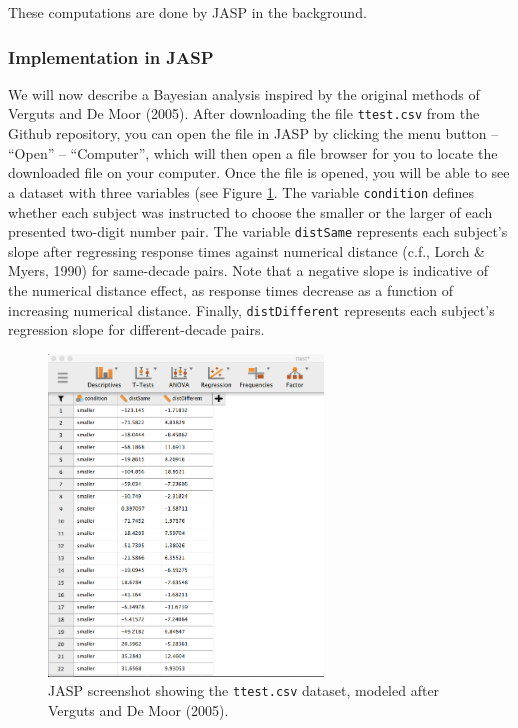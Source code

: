 \documentclass[english,,doc,floatsintext]{apa6}
\begin{document}
These computations are done by JASP in the background.

\hypertarget{implementation-in-jasp}{%
\subsubsection{Implementation in JASP}\label{implementation-in-jasp}}

We will now describe a Bayesian analysis inspired by the original methods of Verguts and De Moor (2005). After downloading the file \texttt{ttest.csv} from the Github repository, you can open the file in JASP by clicking the menu button -- \enquote{Open} -- \enquote{Computer}, which will then open a file browser for you to locate the downloaded file on your computer. Once the file is opened, you will be able to see a dataset with three variables (see Figure \ref{fig:ttestData}. The variable \texttt{condition} defines whether each subject was instructed to choose the smaller or the larger of each presented two-digit number pair. The variable \texttt{distSame} represents each subject's slope after regressing response times against numerical distance (c.f., Lorch \& Myers, 1990) for same-decade pairs. Note that a negative slope is indicative of the numerical distance effect, as response times decrease as a function of increasing numerical distance. Finally, \texttt{distDifferent} represents each subject's regression slope for different-decade pairs.

\begin{figure}
\centering
\includegraphics[width=0.65\textwidth,height=\textheight]{figures/ttestData.png}
\caption{\label{fig:ttestData}JASP screenshot showing the \texttt{ttest.csv} dataset, modeled after Verguts and De Moor (2005).}
\end{figure}
\end{document}
